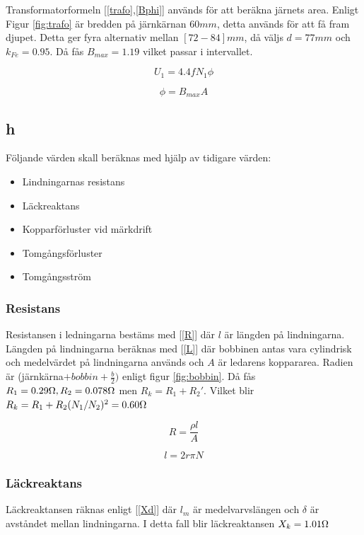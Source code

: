\documentclass{article}
\begin{document}
Transformatorformeln [\ref{trafo},\ref{Bphi}] används för att beräkna järnets area.
Enligt Figur \ref{fig:trafo} är bredden på järnkärnan $60 mm$, detta används för att få fram djupet.
Detta ger fyra alternativ mellan $[72 - 84] mm$, då väljs $d=77 mm$ och $k_{Fe}=0.95$.
Då fås $B_{max}=1.19$ vilket passar i intervallet.


\begin{equation}
  U_1=4.4 f N_1 \phi
  \label{trafo}
\end{equation}

\begin{equation}
  \phi=B_{max} A
  \label{Bphi}
\end{equation}

\subsection{h}
Följande värden skall beräknas med hjälp av tidigare värden:

\begin{itemize}
  \item Lindningarnas resistans
  \item Läckreaktans
  \item Kopparförluster vid märkdrift
  \item Tomgångsförluster
  \item Tomgångsström
\end{itemize}

\subsubsection{Resistans}
Resistansen i ledningarna bestäms med [\ref{R}] där $l$ är längden på lindningarna.
Längden på lindningarna beräknas med [\ref{L}] där bobbinen antas vara cylindrisk och medelvärdet på lindningarna används och $A$ är ledarens koppararea.
Radien är (järnkärna$+bobbin+\frac{b}{2})$ enligt figur \ref{fig:bobbin}.
Då fås $R_1=0.29 \ohm,R_2=0.078 \ohm$ men $R_k=R_1+R_2'$.
Vilket blir $R_k=R_1+R_2 (N_1/N_2)^2=0.60 \ohm$

\begin{equation}
  R=\frac{\rho l}{A}
  \label{R}
\end{equation}

\begin{equation}
  l=2 r \pi N
  \label{L}
\end{equation}

\subsubsection{Läckreaktans}
Läckreaktansen räknas enligt [\ref{Xd}] där $l_m$ är medelvarvslängen och $\delta$ är avståndet mellan lindningarna.
I detta fall blir läckreaktansen $X_k=1.01 \ohm $
\end{document}
